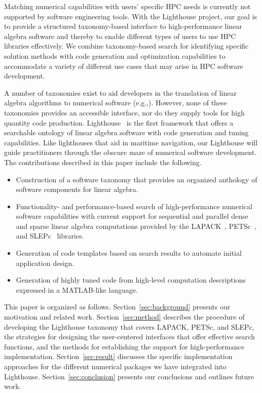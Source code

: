 \documentclass{sig-alternate}
\begin{document}
Matching numerical capabilities with users' specific HPC needs is currently not supported by software engineering tools.
With the Lighthouse project, our goal is to provide a structured taxonomy-based interface to high-performance linear algebra software
and thereby to enable
different types of users to use HPC libraries effectively. We combine taxonomy-based search for identifying specific
solution methods with code generation and optimization capabilities to accommodate a variety of different use cases
that may arise in HPC software development. 

A number of taxonomies exist to aid developers in the translation of linear algebra algorithms to numerical software
(e.g.,\cite{JackMark:Online,blas:Online,GAMS,LAPACKSearch}). However, none of these taxonomies provides an accessible
interface, nor do they supply tools for high quantity code production. Lighthouse~\cite{lighthouse:Online} is the first framework that offers a
searchable ontology of linear algebra software with code generation and tuning capabilities. Like lighthouses 
that aid in maritime navigation,
our Lighthouse will guide practitioners through the obscure maze of numerical software development.
The contributions described in this paper include the following.

\begin{itemize}
    \item Construction of a software taxonomy that provides an organized anthology of software components for linear algebra.
    \item Functionality- and performance-based search of high-performance numerical software capabilities with current support for sequential and parallel dense and sparse linear algebra computations provided by the 
LAPACK~\cite{LAPACK,lapack:Online},
PETSc~\cite{petsc-user-ref,petsc-web-page,petsc-efficient}, and SLEPc~\cite{Hernandez:2005:SSF,slepc:Online}
libraries.
    \item Generation of code templates based on search results to automate initial application design.
    \item Generation of highly tuned code from high-level computation descriptions expressed in a MATLAB-like language. 
\end{itemize}

This paper is organized as follows. Section~\ref{sec:background} presents our motivation and related work.
Section~\ref{sec:method} describes the procedure of developing the Lighthouse taxonomy that covers 
LAPACK, PETSc, and SLEPc, the strategies for designing the user-centered interfaces that offer effective
search functions, and the methods for establishing the support for high-performance implementation.
Section~\ref{sec:result} discusses the specific implementation approaches for the different numerical packages we have integrated into
Lighthouse. Section~\ref{sec:conclusion} presents our conclusions and outlines future work.
\end{document}
